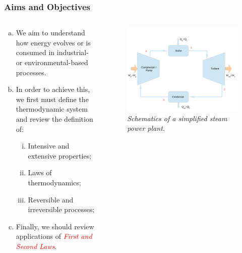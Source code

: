 \documentclass[10pt,compress,handout,ignorenonframetext]{beamer}
\begin{document}
\begin{frame}
 \frametitle{Aims and Objectives}
  \begin{columns}
    \begin{column}[l]{0.6\linewidth}
     \begin{enumerate}[(a)]
      \item <1-> We aim to understand how energy evolves or is consumed in industrial- or environmental-based processes.
      \item <2-> In order to achieve this, we first must define the thermodynamic system and review the definition of:
       \begin{enumerate}[(i)]
        \item <2-> Intensive and extensive properties;
        \item <2-> Laws of thermodynamics;
        \item <2-> Reversible and irreversible processes;
       \end{enumerate}
      \item <3->Finally, we should review applications of \textcolor{red}{{\it First and Second Laws}}. 
     \end{enumerate}
    \end{column}
     \begin{column}[l]{0.4\linewidth}
      \begin{figure}%
        \begin{center}
          \includegraphics[width=\columnwidth,clip]{./Pics/Fig_SteamPowerPlant2}
           \caption{{\it Schematics of a simplified steam power plant.}} 
        \end{center}
      \end{figure}
    \end{column}
  \end{columns}
\end{frame}
\end{document}
